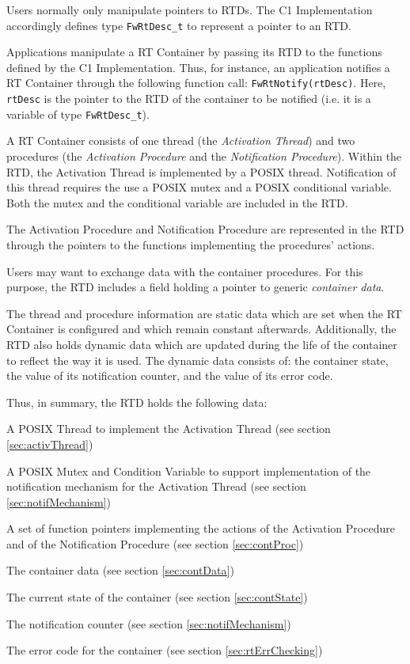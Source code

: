 \documentclass[a4paper,10pt]{article}
\newenvironment{fw_itemize}						%
{\begin{itemize}
  \setlength{\itemsep}{1mm}
  \setlength{\parskip}{0pt}
  \setlength{\parsep}{0pt}}
{\end{itemize}}
\begin{document}
Users normally only manipulate pointers to RTDs. The C1 Implementation accordingly defines type \texttt{FwRtDesc\_t} to represent a pointer to an RTD.

Applications manipulate a RT Container by passing its RTD to the functions defined by 
the C1 Implementation. Thus, for instance, an application notifies a RT Container through 
the following function call: \texttt{FwRtNotify(rtDesc)}. Here, \texttt{rtDesc} is the pointer to the RTD of the container to be notified (i.e. it is a variable of type \texttt{FwRtDesc\_t}). 

A RT Container consists of one thread (the \emph{Activation Thread}) and two procedures (the \emph{Activation Procedure} and the \emph{Notification Procedure}). Within the RTD, the Activation Thread is implemented by a POSIX thread. Notification of this thread requires the use a POSIX mutex and a POSIX conditional variable. Both the mutex and the conditional variable are included in the RTD. 

The Activation Procedure and Notification Procedure are represented in the RTD through the pointers to the functions implementing the procedures' actions.

Users may want to exchange data with the container procedures. For this purpose, the RTD includes a field holding a pointer to generic \emph{container data}.

The thread and procedure information are static data which are set when the RT Container is configured and which remain constant afterwards. Additionally, the RTD also holds dynamic data which are updated during the life of the container to reflect the way it is used. The dynamic data consists of: the container state, the value of its notification counter, and the value of its error code.

Thus, in summary, the RTD holds the following data:

\begin{fw_itemize}
\item A POSIX Thread to implement the Activation Thread (see section \ref{sec:activThread})
\item A POSIX Mutex and Condition Variable to support implementation of the notification mechanism for the Activation Thread (see section \ref{sec:notifMechanism})
\item A set of function pointers implementing the actions of the Activation Procedure and of the Notification Procedure (see section \ref{sec:contProc})
\item The container data (see section \ref{sec:contData})
\item The current state of the container (see section \ref{sec:contState})
\item The notification counter (see section \ref{sec:notifMechanism})
\item The error code for the container (see section \ref{sec:rtErrChecking})
\end{fw_itemize} 
\end{document}
